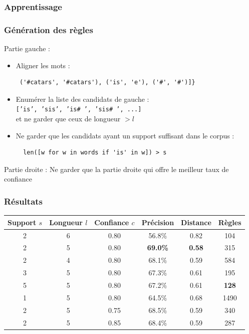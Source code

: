 \documentclass{beamer}
\begin{document}
\begin{frame}[fragile]
\frametitle{Apprentissage}
\frametitle{Génération des règles}

	\begin{block}{Partie gauche :}
	 	\begin{itemize}
	 	\item Aligner les mots : 
	 	{\scriptsize \begin{verbatim} ('#catars', '#catars'), ('is', 'e'), ('#', '#')]}
	 	 	 \end{verbatim}	}
	 	
	 	\item Enumérer la liste des candidats de gauche :\\
	 		{\scriptsize \texttt{['is', 'sis', 'is\# ', 'sis\# ', ...]}	}  \\
	 		et ne garder que ceux de longueur $> l$
	 		 \vspace{0.6cm}
	 		
	 	\item Ne garder que les candidats ayant un support suffisant dans le corpus :
	 	{\scriptsize \begin{verbatim}  len([w for w in words if 'is' in w]) > s
		\end{verbatim}	}
		
		\end{itemize}
	\end{block}
	
	\begin{block}{Partie droite :}
	Ne garder que la partie droite qui offre le meilleur taux de confiance
	\end{block}		
\end{frame}

\begin{frame}
\frametitle{Résultats}

\begin{center}
\begin{tabular}{|c|c|c||c|c|c|}
\hline
Support $s$&Longueur $l$&Confiance $c$&Précision&Distance&Règles\\
\hline
2&6&0.80&56.8\%&0.82&104\\
\hline
2&5&0.80&\textbf{69.0\%}&\textbf{0.58}&315\\
\hline
2&4&0.80&68.1\%&0.59&584\\
\hline
\hline
3&5&0.80&67.3\%&0.61&195\\
\hline
5&5&0.80&67.2\%&0.61&\textbf{128}\\
\hline
1&5&0.80&64.5\%&0.68&1490\\
\hline
\hline
2&5&0.75&68.5\%&0.59&340\\
\hline
2&5&0.85&68.4\%&0.59&287\\
\hline
\end{tabular}
\end{center}
\end{frame}
\end{document}
